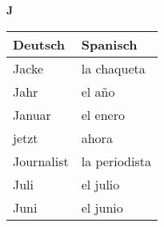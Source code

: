 \begin{flushright}\begin{Huge}\textbf{J}\end{Huge}\end{flushright}

\begin{longtable}{p{} p{}} 
\textbf{Deutsch}     & \textbf{Spanisch}                                       \\ \hline
\hline
\endhead %
Jacke & la chaqueta\\
Jahr & el año\\
Januar & el enero \\
jetzt & ahora\\
Journalist & la periodista \\
Juli & el julio\\
Juni & el junio\\

\end{longtable}
